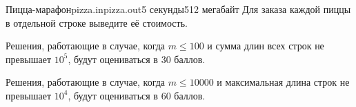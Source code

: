 \begin{problem}{Пицца-марафон}{pizza.in}{pizza.out}{5 секунды}{512 мегабайт}
\OutputFile
Для заказа каждой пиццы в отдельной строке выведите её стоимость.	

\Examples
\begin{example}
%
%
\end{example}

\Note
Решения, работающие в случае, когда $m \le 100$ и сумма длин всех строк не превышает $10^5$, будут оцениваться в $30$ баллов.

Решения, работающие в случае, когда $m \le 10000$ и максимальная длина строк не превышает $10^4$, будут оцениваться в $60$ баллов.

\end{problem}
